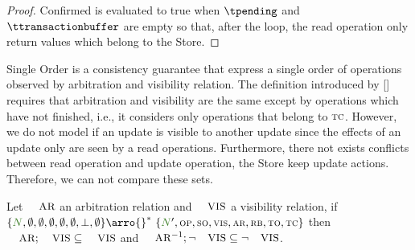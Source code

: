\begin{proof} Confirmed is evaluated to true when $\tpending$ and $\ttransactionbuffer$ are empty so that, after the loop, the read operation only return values which belong to the Store.
\end{proof}	


Single Order is a consistency guarantee that express a single order of operations observed by arbitration and visibility relation. The definition introduced by [] requires that arbitration and visibility are the same except by operations which have not finished, i.e., it considers only operations that belong to $\textsc{\scriptsize{TC}}$. However, we do not model if an update is visible to another update since the effects of an update only are seen by a read operations. Furthermore, there not exists conflicts between read operation and update operation, the Store keep update actions. Therefore, we can not compare these sets. 

\begin{theorem}

Let $\textsc{\small{AR}}$ an arbitration relation and $\textsc{\small{VIS}}$ a visibility relation, if $\environmenttran{\systemterm}{\emptyset}{\emptyset}{\emptyset}{\emptyset}{\emptyset}{\undefined}{\emptyset} \arro{} ^*\ \environmenttran{\systemterm'}{\op}{\so}{\vis}{\arb}{\rb}{\tx}{\tc}$ then $\textsc{\small{AR}};\textsc{\small{VIS}} \subseteq \textsc{\small{VIS}}$ and  $\textsc{\small{AR}}^{-1};\neg\textsc{\small{VIS}} \subseteq \neg\textsc{\small{VIS}}$.


\end{theorem}
 


